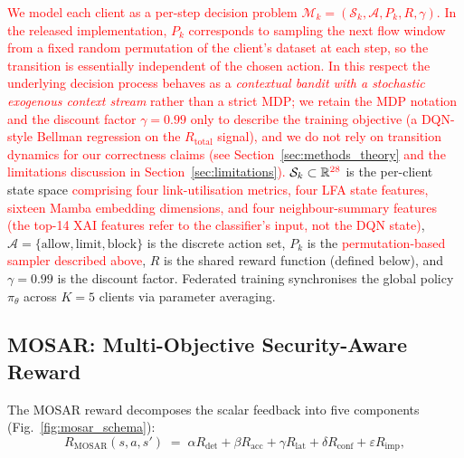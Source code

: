 \documentclass[journal]{IEEEtran}
\newcommand{\rev}[1]{\textcolor{red}{#1}}
\begin{document}
\rev{We model each client as a per-step decision problem
$\mathcal{M}_k = (\mathcal{S}_k, \mathcal{A}, P_k, R, \gamma)$. In the released implementation, $P_k$ corresponds to sampling the next flow window from a fixed random permutation of the client's dataset at each step, so the transition is essentially independent of the chosen action. In this respect the underlying decision process behaves as a \emph{contextual bandit with a stochastic exogenous context stream} rather than a strict MDP; we retain the MDP notation and the discount factor $\gamma = 0.99$ only to describe the training objective (a DQN-style Bellman regression on the $R_{\text{total}}$ signal), and we do not rely on transition dynamics for our correctness claims (see Section~\ref{sec:methods_theory} and the limitations discussion in Section~\ref{sec:limitations}).}
$\mathcal{S}_k \subset \mathbb{R}^{\rev{28}}$ is the per-client state space
\rev{comprising four link-utilisation metrics, four LFA state features, sixteen Mamba embedding dimensions, and four neighbour-summary features (the top-14 XAI features refer to the classifier's input, not the DQN state)}, $\mathcal{A} = \{\text{allow},
\text{limit}, \text{block}\}$ is the discrete action set, $P_k$ is the
\rev{permutation-based sampler described above}, $R$ is the shared reward function
(defined below), and $\gamma = 0.99$ is the discount factor. Federated
training synchronises the global policy $\pi_\theta$ across $K = 5$
clients via parameter averaging\cite{mcmahan2017fedavg,li2020fedprox}.

\subsection{MOSAR: Multi-Objective Security-Aware
Reward}\label{sec:methods_mosar}

The MOSAR reward decomposes the scalar feedback into five components
(Fig.~\ref{fig:mosar_schema}):
\begin{equation}\label{eq:mosar}
R_{\text{MOSAR}}(s,a,s') \;=\;
  \alpha R_{\text{det}} +
  \beta  R_{\text{acc}} +
  \gamma R_{\text{lat}} +
  \delta R_{\text{conf}} +
  \varepsilon R_{\text{imp}},
\end{equation}
\end{document}
